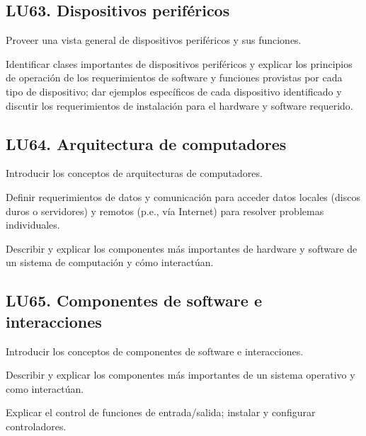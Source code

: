 \subsection{LU63. Dispositivos periféricos}\label{sec:LU63}
\begin{LearningUnit}
\begin{LUGoal}
\item Proveer una vista general de dispositivos periféricos y sus funciones.
\end{LUGoal}

\begin{LUObjective}
\item Identificar clases importantes de dispositivos periféricos y explicar los principios de operación de los requerimientos de software y funciones provistas por cada tipo de dispositivo; dar ejemplos específicos de cada dispositivo identificado y discutir los requerimientos de instalación para el hardware y software requerido.
\end{LUObjective}
\end{LearningUnit}

\subsection{LU64. Arquitectura de computadores}\label{sec:LU64}
\begin{LearningUnit}
\begin{LUGoal}
\item Introducir los conceptos de arquitecturas de computadores.
\end{LUGoal}

\begin{LUObjective}
\item Definir requerimientos de datos y comunicación para acceder datos locales (discos duros o servidores) y remotos (p.e., vía Internet) para resolver problemas individuales.
\item Describir y explicar los componentes más importantes de hardware y software de un sistema de computación y cómo interactúan.
\end{LUObjective}
\end{LearningUnit}

\subsection{LU65. Componentes de software e interacciones}\label{sec:LU65}
\begin{LearningUnit}
\begin{LUGoal}
\item Introducir los conceptos de componentes de software e interacciones.
\end{LUGoal}

\begin{LUObjective}
\item Describir y explicar los componentes más importantes de un sistema operativo y como interactúan.
\item Explicar el control de funciones de entrada/salida; instalar y configurar controladores.
\end{LUObjective}
\end{LearningUnit}


